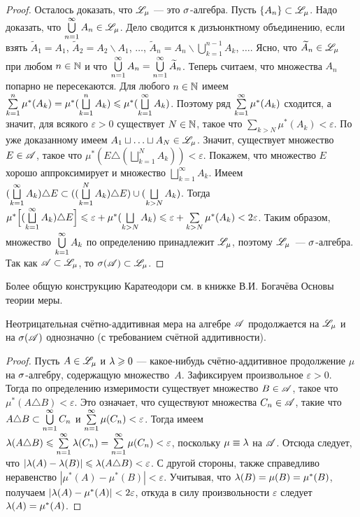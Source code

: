 \documentclass[10pt]{article}
\newcommand{\ve}{\varepsilon}
\begin{document}
\begin{proof}
Осталось доказать, что $\mathscr{L}_{\mu}$ --- это $\sigma$-алгебра. Пусть
$\{A_n\}\subset\mathscr{L}_{\mu}$. Надо доказать, что $\bigcup\limits_{n=1}^{\infty}
A_n\in\mathscr{L}_{\mu}$. Дело сводится к дизъюнктному объединению, если
взять $\widetilde A_1=A_1$, $\widetilde A_2=A_2\backslash A_1$,
$\ldots$, $\widetilde A_n=A_n\backslash\bigcup
\limits_{k=1}^{n-1}A_k$, $\ldots$. Ясно, что $\widetilde
A_n\in\mathscr{L}_{\mu}$ при любом $n\in\mathbb{N}$ и что $\bigcup\limits_{n=1}^{\infty}
A_n=\bigcup\limits_{n=1}^{\infty}\widetilde A_n$. Теперь считаем, что множества $A_n$
попарно не пересекаются. Для любого $n\in\mathbb{N}$ имеем
$\sum\limits_{k=1}^n\mu^*(A_k)=\mu^*(\bigsqcup\limits_{k=1}^nA_k)\bw
\le\mu^*(\bigsqcup\limits_{k=1}^\infty A_k)$. Поэтому ряд
$\sum\limits_{k=1}^{\infty}\mu^*(A_k)$ сходится, а значит, для всякого $\ve>0$
существует $N\in\mathbb{N}$, такое что $\sum\limits_{k>N}\mu^*(A_k)<\ve$. По
уже доказанному имеем $A_1\sqcup\ldots\sqcup A_N\in\mathscr{L}_{\mu}$.
Значит, существует множество $E\in\mathscr{A}$, такое что
$\mu^*(E\triangle(\bigsqcup\limits_{k=1}^N A_k))<\ve$. Покажем, что
множество $E$ хорошо аппроксимирует и множество
$\bigsqcup\limits_{k=1}^\infty A_k$. Имеем
$(\bigsqcup\limits_{k=1}^\infty A_k)\bw \triangle E \bw
\subset((\bigsqcup\limits_{k=1}^N A_k) \bw \triangle E)\bw
\cup(\bigsqcup\limits_{k>N}A_k)$. Тогда
$\mu^*\BS{(\bigsqcup\limits_{k=1}^\infty A_k) \triangle E} \bw \le
\ve+\mu^*(\bigsqcup\limits_{k>N}A_k)
\bw\le\ve+\sum\limits_{k>N}\mu^*(A_k)< 2\ve$. Таким образом,
множество $\bigcup\limits_{k=1}^{\infty} A_k$ по определению принадлежит $\mathscr{L}_{\mu}$,
поэтому $\mathscr{L}_\mu$~--- $\sigma$-алгебра. Так как $\mathscr{A}\subset\mathscr{L}_\mu$, то
$\sigma(\mathscr{A})\subset \mathscr{L}_\mu$.
\end{proof}

\begin{note}
Более общую конструкцию Каратеодори см. в книжке В.И. Богачёва 
Основы теории меры.
\end{note}

\begin{imp}
Неотрицательная счётно-аддитивная мера на алгебре $\mathscr{A}$ продолжается
на $\mathscr{L}_{\mu}$ и на $\sigma(\mathscr{A})$ однозначно (с требованием счётной
аддитивности).
\end{imp}

\begin{proof}
Пусть $A\in\mathscr{L}_{\mu}$ и $\lambda\geqslant0$ --- какое-нибудь счётно-аддитивное
продолжение $\mu$ на $\sigma$-алгебру, содержащую множество~$A$.
Зафиксируем произвольное $\ve>0$. Тогда по определению измеримости
существует множество $B\bw\in\As$, такое что $\mu^*(A\triangle
B)<\ve$. Это означает, что существуют множества $C_n\in\mathscr{A}$, такие
что $A\triangle B\bw \subset\cupnui C_n$ и $\sumnui\mu(C_n)<\ve$.
Тогда имеем $\la(A\triangle
B)\le\sumnui\la(C_n)=\sumnui\mu(C_n)<\ve$, поскольку $\mu\equiv\lambda$
на $\mathscr{A}$. Отсюда следует, что $|\la(A)-\la(B)|\le\la(A\triangle
B)<\ve$. С другой стороны, также справедливо неравенство
$|\mu^*(A)-\mu^*(B)|<\ve$. Учитывая, что $\lambda(B)=\mu(B)=\mu^*(B)$,
получаем $|\la(A)-\mu^*(A)|<2\ve$, откуда в силу произвольности
$\ve$ следует $\lambda(A)=\mu^*(A)$.
\end{proof}
\end{document}
